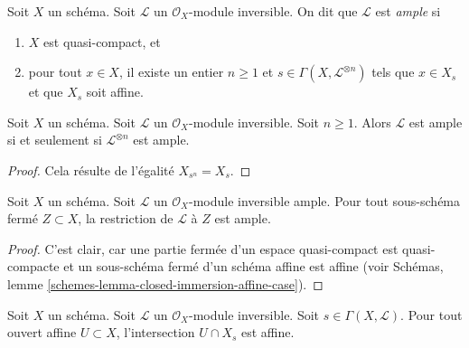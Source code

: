 \begin{definition}
\label{definition-ample}
\begin{reference}
\cite[II Definition 4.5.3]{EGA}
\end{reference}
Soit $X$ un schéma.
Soit $\mathcal{L}$ un $\mathcal{O}_X$-module inversible.
On dit que $\mathcal{L}$ est {\it ample} si
\begin{enumerate}
\item $X$ est quasi-compact, et
\item pour tout $x \in X$, il existe un entier $n \geq 1$
et $s \in \Gamma(X, \mathcal{L}^{\otimes n})$ tels
que $x \in X_s$ et que $X_s$ soit affine.
\end{enumerate}
\end{definition}

\begin{lemma}
\label{lemma-ample-power-ample}
\begin{reference}
\cite[II Proposition 4.5.6(i)]{EGA}
\end{reference}
Soit $X$ un schéma. Soit $\mathcal{L}$ un $\mathcal{O}_X$-module inversible.
Soit $n \geq 1$. Alors $\mathcal{L}$ est ample si et seulement si
$\mathcal{L}^{\otimes n}$ est ample.
\end{lemma}

\begin{proof}
Cela résulte de l'égalité $X_{s^n} = X_s$.
\end{proof}

\begin{lemma}
\label{lemma-ample-on-closed}
Soit $X$ un schéma.
Soit $\mathcal{L}$ un $\mathcal{O}_X$-module inversible ample.
Pour tout sous-schéma fermé $Z \subset X$, la restriction de
$\mathcal{L}$ à $Z$ est ample.
\end{lemma}

\begin{proof}
C'est clair, car une partie fermée d'un espace quasi-compact est quasi-compacte
et un sous-schéma fermé d'un schéma affine est affine (voir
Schémas, lemme \ref{schemes-lemma-closed-immersion-affine-case}).
\end{proof}

\begin{lemma}
\label{lemma-affine-cap-s-open}
Soit $X$ un schéma. Soit $\mathcal{L}$ un $\mathcal{O}_X$-module inversible.
Soit $s \in \Gamma(X, \mathcal{L})$. Pour tout ouvert affine $U \subset X$,
l'intersection $U \cap X_s$ est affine.
\end{lemma}

